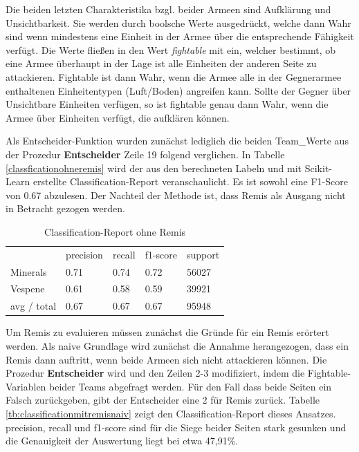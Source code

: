Die beiden letzten Charakteristika bzgl. beider Armeen sind Aufklärung und Unsichtbarkeit. Sie werden durch boolsche Werte ausgedrückt, welche dann Wahr sind wenn mindestens eine Einheit in der Armee über die entsprechende Fähigkeit verfügt. Die Werte fließen in den Wert \textit{fightable} mit ein, welcher bestimmt, ob eine Armee überhaupt in der Lage ist alle Einheiten der anderen Seite zu attackieren. Fightable ist dann Wahr, wenn die Armee alle in der Gegnerarmee enthaltenen Einheitentypen (Luft/Boden) angreifen kann. Sollte der Gegner über Unsichtbare Einheiten verfügen, so ist fightable genau dann Wahr, wenn die Armee über Einheiten verfügt, die aufklären können.

Als Entscheider-Funktion wurden zunächst lediglich die beiden Team\_Werte aus der Prozedur \textbf{Entscheider} Zeile 19 folgend verglichen. In Tabelle \ref{classficationohneremis} wird der aus den berechneten Labeln und mit Scikit-Learn erstellte Classification-Report veranschaulicht. Es ist sowohl eine F1-Score von 0.67 abzulesen. Der Nachteil der Methode ist, dass Remis als Ausgang nicht in Betracht gezogen werden.  

\begin{table}
\centering
\caption{Classification-Report ohne Remis}
\begin{tabular}{@{}lllll@{}}
\hline
& precision & recall & f1-score & support\\
Minerals & 0.71 & 0.74 & 0.72 & 56027\\
Vespene & 0.61 & 0.58 & 0.59 & 39921\\
 avg / total & 0.67 & 0.67 & 0.67 & 95948\\
\hline
\end{tabular}
\label{tb:classificationohneremis}
\end{table}

Um Remis zu evaluieren müssen zunächst die Gründe für ein Remis erörtert werden. Als naive Grundlage wird zunächst die Annahme herangezogen, dass ein Remis dann auftritt, wenn beide Armeen sich nicht attackieren können. Die Prozedur \textbf{Entscheider} wird und den Zeilen 2-3 modifiziert, indem die Fightable-Variablen beider Teams abgefragt werden. Für den Fall dass beide Seiten ein Falsch zurückgeben, gibt der Entscheider eine 2 für Remis zurück. Tabelle \ref{tb:classificationmitremisnaiv} zeigt den Classification-Report dieses Ansatzes.  precision, recall und f1-score sind für die Siege beider Seiten stark gesunken und die Genauigkeit der Auswertung liegt bei etwa 47,91\%.  

